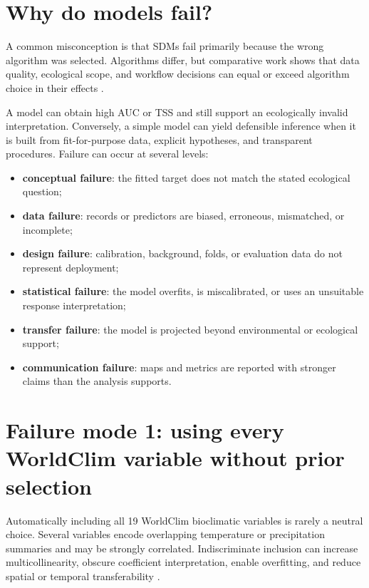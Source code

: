 \section{Why do models fail?}

A common misconception is that SDMs fail primarily because the wrong algorithm was selected. Algorithms differ, but comparative work shows that data quality, ecological scope, and workflow decisions can equal or exceed algorithm choice in their effects \parencite{elith2006novel,araujo2007ensemble,guisan2017habitat}.

A model can obtain high AUC or TSS and still support an ecologically invalid interpretation. Conversely, a simple model can yield defensible inference when it is built from fit-for-purpose data, explicit hypotheses, and transparent procedures. Failure can occur at several levels:

\begin{itemize}
\item \textbf{conceptual failure}: the fitted target does not match the stated ecological question;
\item \textbf{data failure}: records or predictors are biased, erroneous, mismatched, or incomplete;
\item \textbf{design failure}: calibration, background, folds, or evaluation data do not represent deployment;
\item \textbf{statistical failure}: the model overfits, is miscalibrated, or uses an unsuitable response interpretation;
\item \textbf{transfer failure}: the model is projected beyond environmental or ecological support;
\item \textbf{communication failure}: maps and metrics are reported with stronger claims than the analysis supports.
\end{itemize}

\section{Failure mode 1: using every WorldClim variable without prior selection}

Automatically including all 19 WorldClim bioclimatic variables is rarely a neutral choice. Several variables encode overlapping temperature or precipitation summaries and may be strongly correlated. Indiscriminate inclusion can increase multicollinearity, obscure coefficient interpretation, enable overfitting, and reduce spatial or temporal transferability \parencite{dormann2013collinearity,guisan2017habitat}.

